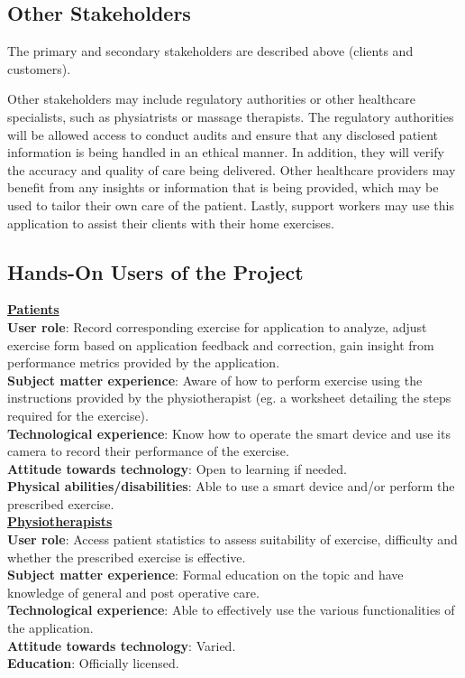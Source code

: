 \documentclass[12pt]{article}
\begin{document}
\subsection{Other Stakeholders}
The primary and secondary stakeholders are described above (clients and customers).

Other stakeholders may include regulatory authorities or other healthcare specialists, such as physiatrists or massage therapists. The regulatory authorities will be allowed access to conduct audits and ensure that any disclosed patient information is being handled in an ethical manner. In addition, they will verify the accuracy and quality of care being delivered. Other healthcare providers may  benefit from any insights or information that is being provided, which may be used to tailor their own care of the patient. Lastly, support workers may use this application to assist their clients with their home exercises. 

\subsection{Hands-On Users of the Project}
\underline{\textbf{Patients}} \\
\textbf{User role}: Record corresponding exercise for application to analyze, adjust exercise form based on application feedback and correction, gain insight from performance metrics provided by the application.\\
\textbf{Subject matter experience}: Aware of how to perform exercise using the instructions provided by the physiotherapist (eg. a worksheet detailing the steps required for the exercise).  \\
\textbf{Technological experience}: Know how to operate the smart device and use its camera to record their performance of the exercise. \\
\textbf{Attitude towards technology}: Open to learning if needed.\\
\textbf{Physical abilities/disabilities}: Able to use a smart device and/or perform the prescribed exercise.\\
\underline{\textbf{Physiotherapists}} \\
\textbf{User role}: Access patient statistics to assess suitability of exercise, difficulty and whether the prescribed exercise is effective. \\
\textbf{Subject matter experience}: Formal education on the topic and have knowledge of general and post operative care. \\
\textbf{Technological experience}: Able to effectively use the various functionalities of the application. \\
\textbf{Attitude towards technology}: Varied. \\
\textbf{Education}: Officially licensed. \\
\end{document}
